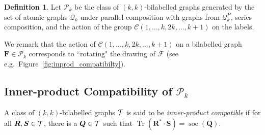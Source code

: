 \documentclass[a4paper,onecolumn,11pt,accepted=2026-01-06]{quantumarticle}
\theoremstyle{plain}
\theoremstyle{remark}
\theoremstyle{definition}
\newtheorem{definition}[thm]{Definition}
\DeclareMathOperator{\tr}{Tr}
\DeclareMathOperator{\soe}{soe}
\def\calP{{\mathcal P}} \def\calQ{{\mathcal Q}} \def\calR{{\mathcal R}}
\newcommand{\cyclicpermutations}{\mathscr{C}(1,\dots, k, 2k, \dots, k+1)}
\begin{document}
\begin{definition}\label{def:pk}
  Let $\mathcal{P}_k$ be the class of $(k, k)$-bilabelled graphs generated by the set of atomic graphs $\mathcal{Q}_k$ under parallel composition with graphs from $\mathcal{Q}_k^P$, series composition, and the action of the group $\cyclicpermutations$ on the labels.
\end{definition}

We remark that the action of $\cyclicpermutations$ on a bilabelled graph $\boldsymbol{F} \in \calP_k$ corresponds to ``rotating" the drawing of $\mathcal{F}$ (see e.g.~Figure~\ref{fig:inprod_compatibilty}). 


\subsection{Inner-product Compatibility of $\calP_k$}\label{sub-sec:inprodcomp}

A class of $(k,k)$-bilabelled graphs ${\mathcal T}$ is said to be \emph{inner-product compatible} if for all $\boldsymbol{R}, \boldsymbol{S} \in {\mathcal T}$, there is a $\boldsymbol{Q} \in {\mathcal T}$ such that $\tr(\boldsymbol{R}^*\cdot \boldsymbol{S}) = \soe(\boldsymbol{Q})$. 
\end{document}

